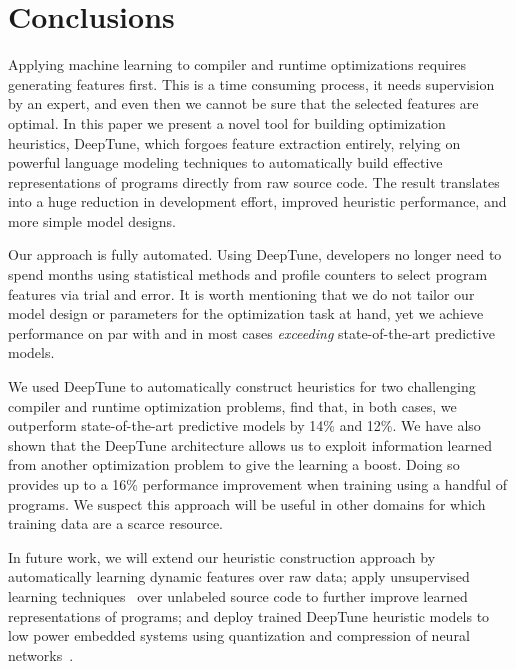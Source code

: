 \section{Conclusions} \label{sec:conclusion}

Applying machine learning to compiler and runtime optimizations requires generating features first. This is a time consuming process, it needs supervision by an expert, and even then we cannot be sure that the selected features are optimal. In this paper we present a novel tool for building optimization heuristics, DeepTune, which forgoes feature extraction entirely, relying on powerful language modeling techniques to automatically build effective representations of programs directly from raw source code. The result translates into a huge reduction in development effort, improved heuristic performance, and more simple model designs.

Our approach is fully automated. Using DeepTune, developers no longer need to spend months using statistical methods and profile counters to select program features via trial and error. It is worth mentioning that we do not tailor our model design or parameters for the optimization task at hand, yet we achieve performance on par with and in most cases \emph{exceeding} state-of-the-art predictive models.

We used DeepTune to automatically construct heuristics for two challenging compiler and runtime optimization problems, find that, in both cases, we outperform state-of-the-art predictive models by 14\% and 12\%. We have also shown that the DeepTune architecture allows us to exploit information learned from another optimization problem to give the learning a boost. Doing so provides up to a 16\% performance improvement when training using a handful of programs. We suspect this approach will be useful in other domains for which training data are a scarce resource.

In future work, we will extend our heuristic construction approach by automatically learning dynamic features over raw data; apply unsupervised learning techniques~\cite{Le2012} over unlabeled source code to further improve learned representations of programs; and deploy trained DeepTune heuristic models to low power embedded systems using quantization and compression of neural networks~\cite{Han2015}.
